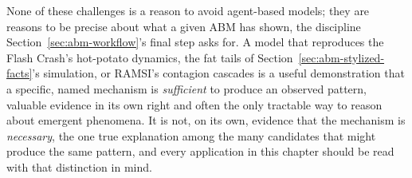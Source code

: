 \documentclass[../ai_in_finance]{subfiles}
\begin{document}
None of these challenges is a reason to avoid agent-based models; they are reasons to be precise about what a given ABM has shown, the discipline Section~\ref{sec:abm-workflow}'s final step asks for. A model that reproduces the Flash Crash's hot-potato dynamics, the fat tails of Section~\ref{sec:abm-stylized-facts}'s simulation, or RAMSI's contagion cascades is a useful demonstration that a specific, named mechanism is \emph{sufficient} to produce an observed pattern, valuable evidence in its own right and often the only tractable way to reason about emergent phenomena. It is not, on its own, evidence that the mechanism is \emph{necessary}, the one true explanation among the many candidates that might produce the same pattern, and every application in this chapter should be read with that distinction in mind.

\end{document}
